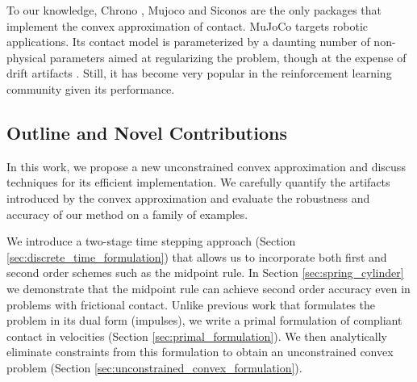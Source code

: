 To our knowledge, Chrono \cite{bib:chrono2016}, Mujoco \cite{bib:mujoco} and
Siconos \cite{bib:acary2019siconos} are the only packages that implement the
convex approximation of contact.  MuJoCo targets robotic applications.
Its contact model is parameterized by a daunting number of non-physical
parameters aimed at regularizing the problem, though at the expense of drift
artifacts \cite{bib:simbenchmark}. Still, it has become very popular in the
reinforcement learning community given its performance.

\subsection{Outline and Novel Contributions}
 In this work, we propose a new
unconstrained convex approximation and discuss techniques for its efficient
implementation. We carefully quantify the artifacts introduced by the convex
approximation and evaluate the robustness and accuracy of our method on a family
of examples.

We introduce a two-stage time stepping approach (Section
\ref{sec:discrete_time_formulation}) that allows us to incorporate both first
and second order schemes such as the midpoint rule. In Section \ref{sec:spring_cylinder} we
demonstrate that the midpoint rule can achieve second order accuracy even in
problems with frictional contact. Unlike previous work
\cite{bib:anitescu2010,bib:todorov2014} that formulates the problem in its dual
form (impulses), we write a primal formulation of compliant contact in
velocities (Section \ref{sec:primal_formulation}). We then analytically
eliminate constraints from this formulation to obtain an unconstrained convex
problem (Section \ref{sec:unconstrained_convex_formulation}).

